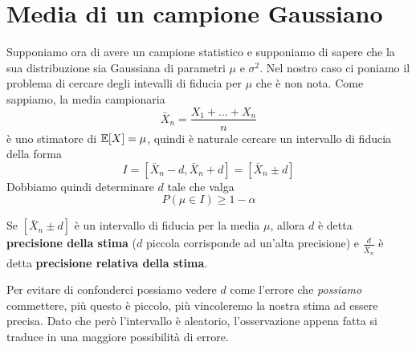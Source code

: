 \section{Media di un campione Gaussiano}
Supponiamo ora di avere un campione statistico e supponiamo di sapere che la sua distribuzione sia
Gaussiana di parametri $\mu$ e $\sigma^2$. Nel nostro caso ci poniamo il problema di cercare degli
intevalli di fiducia per $\mu$ che è non nota. Come sappiamo, la media campionaria
\[ \bar{X}_n = \frac{X_1 + \dots + X_n}{n} \]
è uno stimatore di $\mathbb{E}[X] = \mu$, quindi è naturale cercare un intervallo di fiducia della forma
\[ I = [\bar{X}_n - d, \bar{X}_n + d] = [\bar{X}_n \pm d] \]
Dobbiamo quindi determinare $d$ tale che valga
\[ P(\mu \in I) \geq 1 - \alpha \]

\begin{definition}
	Se $[\bar{X}_n \pm d]$ è un intervallo di fiducia per la media $\mu$, allora $d$ è detta
	\textbf{precisione della stima} ($d$ piccola corrisponde ad un'alta precisione) e
	$\frac{d}{\bar{X}_n}$ è detta \textbf{precisione relativa della stima}.
\end{definition}

Per evitare di confonderci possiamo vedere $d$ come l'errore che \emph{possiamo} commettere, più
questo è piccolo, più vincoleremo la nostra stima ad essere precisa. Dato che però l'intervallo è
aleatorio, l'osservazione appena fatta si traduce in una maggiore possibilità di errore.

